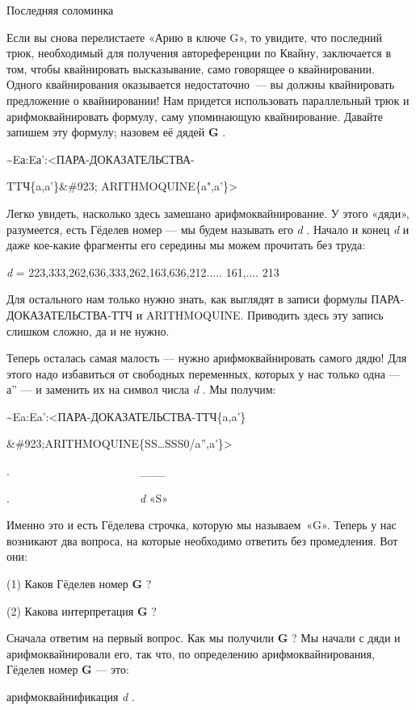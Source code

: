 \documentclass[../main.tex]{subfiles}
\begin{document}
Последняя соломинка

Если вы снова перелистаете «Арию в ключе G», то увидите, что последний трюк, необходимый для получения автореференции по Квайну, заключается в том, чтобы квайнировать высказывание, само говорящее о квайнировании. Одного квайнирования оказывается недостаточно~--- вы должны квайнировать предложение о квайнировании! Нам придется использовать параллельный трюк и арифмоквайнировать формулу, саму упоминающую квайнирование. Давайте запишем эту формулу; назовем её дядей \textbf{G} .

\textasciitilde Eа:Eа':\textless ПАРА-ДОКАЗАТЕЛЬСТВА-

TTЧ\{a,a'\}\&\#923; ARITHMOQUINE\{a",a'\}\textgreater{}

Легко увидеть, насколько здесь замешано арифмоквайнирование. У этого «дяди», разумеется, есть Гёделев номер --- мы будем называть его \emph{d} . Начало и конец \emph{d} и даже кое-какие фрагменты его середины мы можем прочитать без труда:

\emph{d} = 223,333,262,636,333,262,163,636,212..... 161,.... 213

Для остального нам только нужно знать, как выглядят в записи формулы ПАРА-ДОКАЗАТЕЛЬСТВА-ТТЧ и ARITHMOQUINE. Приводить здесь эту запись слишком сложно, да и не нужно.

Теперь осталась самая малость --- нужно арифмоквайнировать самого дядю! Для этого надо избавиться от свободных переменных, которых у нас только одна --- а'' --- и заменить их на символ числа \emph{d} . Мы получим:

\textasciitilde Ea:Ea':\textless ПАРА-ДОКАЗАТЕЛЬСТВА-ТТЧ\{a,a'\}

\&\#923;ARITHMOQUINE\{SS\ldots SSS0/a'',a'\}\textgreater{}

.~~~~~~~~~~~~~~~~~~~~~~~\textbar\_\_\_\textbar{}

.~~~~~~~~~~~~~~~~~~~~~~~\emph{d} «S»~

Именно это и есть Гёделева строчка, которую мы называем~«G». Теперь у нас возникают два вопроса, на которые необходимо ответить без промедления. Вот они:

(1) Каков Гёделев номер \textbf{G} ?

(2) Какова интерпретация \textbf{G} ?

Сначала ответим на первый вопрос. Как мы получили \textbf{G} ? Мы начали с дяди и арифмоквайнировали его, так что, по определению арифмоквайнирования, Гёделев номер \textbf{G} --- это:

арифмоквайнификация \emph{d} .
\end{document}
